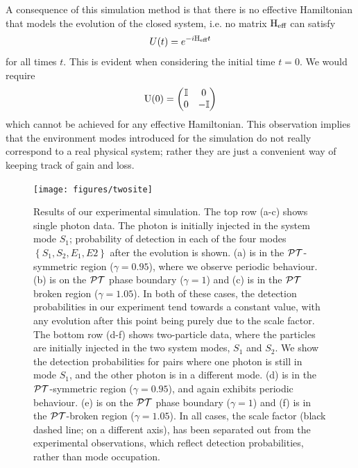 A consequence of this simulation method is that there is no effective
Hamiltonian that models the evolution of the closed system, i.e. no matrix
\(\mathrm{H}_{\text{eff}}\) can satisfy
\begin{equation}
  U\!\left(t\right) = e^{-i\mathrm{H}_{\text{eff}}t}
\end{equation}
for all times \(t\). This is evident when considering the initial time \(t=0\).
We would require
\begin{equation}
  \mathrm{U}\!\left(0\right) = \begin{pmatrix}
    \mathbb{I} & 0 \\
    0 & -\mathbb{I}
  \end{pmatrix}
\end{equation}
which cannot be achieved for any effective Hamiltonian. This observation implies
that the environment modes introduced for the simulation do not really
correspond to a real physical system; rather they are just a convenient way of
keeping track of gain and loss.

\begin{figure}[t]
  \centering
  \texttt{[image: figures/twosite]}
  \caption[Results of simulation]
    {Results of our experimental simulation. The top row (a-c) shows
    single photon data. The photon is initially injected in the system mode
    \(S_1\); probability of detection in each of the four modes \(\left\{S_1,
    S_2, E_1, E2\right\}\) after the evolution is shown. (a) is in the
    \(\mathcal{PT}{}\)-symmetric region (\(\gamma=0.95\)), where we observe periodic
    behaviour. (b) is on the \(\mathcal{PT}{}\) phase boundary (\(\gamma=1\)) and (c) is
    in the \(\mathcal{PT}{}\) broken region (\(\gamma=1.05\)). In both of these cases,
    the detection probabilities in our
    experiment tend towards a constant value, with any evolution after this
    point being purely due to the scale factor. The bottom row (d-f) shows
    two-particle data, where the particles are initially injected in the two
    system modes, \(S_1\) and \(S_2\). We show the detection probabilities for
    pairs where one photon is still in mode \(S_1\), and the other photon is in
    a different mode. (d) is in the \(\mathcal{PT}{}\)-symmetric region
    (\(\gamma=0.95\)), and again exhibits periodic behaviour. (e) is on the
    \(\mathcal{PT}{}\) phase boundary (\(\gamma=1\)) and (f) is in the \(\mathcal{PT}{}\)-broken
    region (\(\gamma=1.05\)). In all cases, the scale factor (black dashed
    line; on a different axis), has been separated out from the experimental
    observations, which reflect detection probabilities, rather than mode
    occupation.}
  \label{fig:twosite}
\end{figure}

